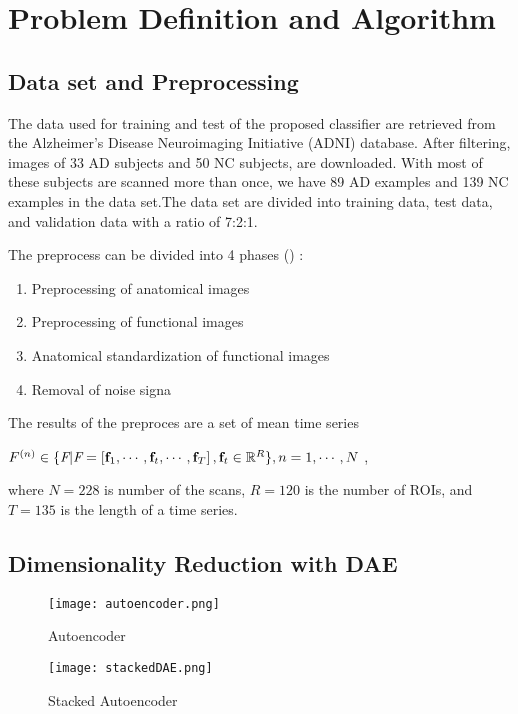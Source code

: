 \section{Problem Definition and Algorithm}

\subsection{Data set and Preprocessing}

The data used for training and test of the proposed classifier are retrieved from the Alzheimer's Disease Neuroimaging Initiative (ADNI) database. After filtering, images of 33 AD subjects and 50 NC subjects,  are downloaded. With most of these subjects are scanned more than once, we have 89 AD examples and 139 NC examples in the data set.The data set are divided into training data, test data, and validation data with a ratio of 7:2:1.

The preprocess can be divided into 4 phases (\cite{suk16}) :
	\begin{enumerate}
	\item Preprocessing of anatomical images
	\item  Preprocessing of functional images
	\item Anatomical standardization of functional images
	\item Removal of noise signa
	\end{enumerate}

The results of the preproces are a set of mean time series 
\begin{center}
$ F^{(n)} \in \{ \emph{F} | \emph{F} = \left[ \textbf{f}_1, \cdots, \textbf{f}_t, \cdots, \textbf{f}_T \right],  \textbf{f}_t \in  \mathbb{R}^{R} \}, n=1,  \cdots, N$ ,
\end{center}
where $N=228$ is number of the scans, $R=120$ is the number of  ROIs, and $T=135$ is the length of a time series. 

\subsection{Dimensionality Reduction with DAE}

\begin{figure}[H!]
    \centering
    \texttt{[image: autoencoder.png]}
    \caption{Autoencoder}
    \label{fig:awesome_image}
\end{figure}
\begin{figure}[H!]
    \centering
    \texttt{[image: stackedDAE.png]}
    \caption{Stacked Autoencoder}
    \label{fig:awesome_image}
\end{figure}


